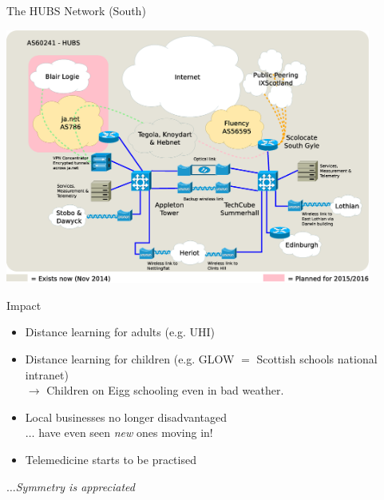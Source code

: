 \documentclass{beamer}
\begin{document}
\begin{frame}{The HUBS Network (South)}
  \begin{center}
    \includegraphics[width=0.9\textwidth]{hubs-nov2014.eps}
  \end{center}
\end{frame}
\begin{frame}{Impact}
  \begin{itemize}
    \item Distance learning for adults (e.g. UHI)
    \item Distance learning for children (e.g. GLOW $=$ Scottish
      schools national intranet)\\
      $\rightarrow$ Children on Eigg schooling even in bad weather.
    \item Local businesses no longer disadvantaged\\
      $\ldots$ have even seen \textit{new} ones moving in!
    \item Telemedicine starts to be practised
  \end{itemize}
  \hfill$\ldots$\textit{Symmetry is appreciated}
\end{frame}
\end{document}
